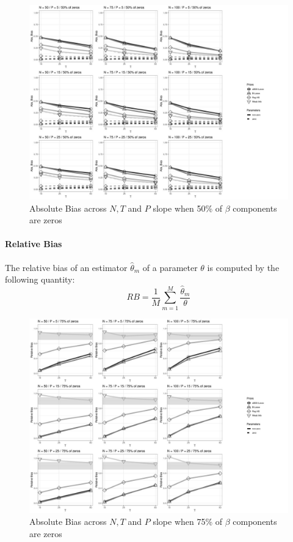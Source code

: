 \documentclass[a4paper,12pt]{article}
\begin{document}
\begin{figure}[]\label{fig:ABias_nz50}
\centering 
\includegraphics[width=18cm]{Abs_Bias_nz50_beta.jpg}
\caption{Absolute Bias across $N, T$ and $P$ slope when 50\% of $\beta$ components are zeros}
\end{figure}

\clearpage
\paragraph{Relative Bias}
The relative bias of an estimator $\hat{\theta}_m$ of a parameter $\theta$ is computed by the following  quantity:
\[  RB = \frac{1}{M} \sum_{m=1}^{M} \dfrac{\hat{\theta}_m}{\theta} \]

\begin{figure}[h]\label{fig:RBias_nz25}
\centering 
\includegraphics[width=18cm]{Rel_Bias_nz25_beta.jpg}
\caption{Absolute Bias across $N, T$ and $P$ slope when 75\% of $\beta$ components are zeros}
\end{figure}
\end{document}
